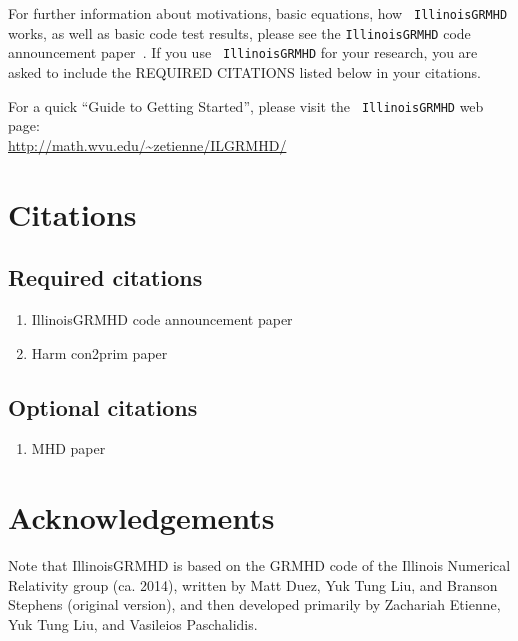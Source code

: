 \documentclass{article}
\begin{document}
For further information about motivations, basic equations, how {\tt
  IllinoisGRMHD} works, as well as basic code test results, please see
the {\tt IllinoisGRMHD} code announcement
paper~\cite{WVUThorns_IllinoisGRMHD_Etienne:2015cea}. If you use {\tt
  IllinoisGRMHD} for your research, you are asked to include the
REQUIRED CITATIONS listed below in your citations.

For a quick ``Guide to Getting Started'', please visit the {\tt
  IllinoisGRMHD} web page:\\ \url{http://math.wvu.edu/~zetienne/ILGRMHD/}

\section{Citations}
\subsection{Required citations}
\begin{enumerate}
\item IllinoisGRMHD code announcement paper~\cite{WVUThorns_IllinoisGRMHD_Etienne:2015cea}
\item Harm con2prim paper~\cite{WVUThorns_IllinoisGRMHD_Noble:2005gf}
\end{enumerate}

\subsection{Optional citations}
\begin{enumerate}
\item MHD paper~\cite{WVUThorns_IllinoisGRMHD_DelZanna:2002rv}
\end{enumerate}

\section{Acknowledgements}

Note that IllinoisGRMHD
is based on the GRMHD code of the Illinois Numerical Relativity
group (ca. 2014), written by Matt Duez, Yuk Tung Liu, and Branson
Stephens (original version), and then developed primarily by
Zachariah Etienne, Yuk Tung Liu, and Vasileios Paschalidis.
\end{document}
